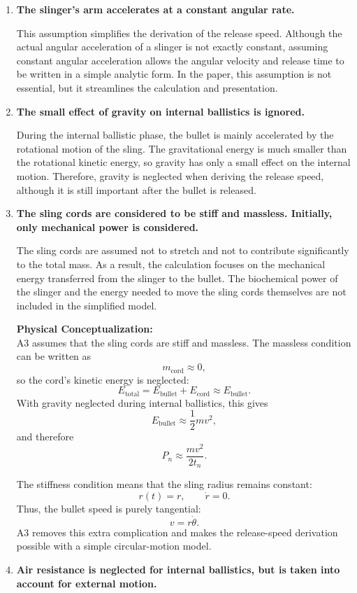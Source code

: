 \documentclass[11pt,letterpaper]{article}
\begin{document}
\begin{enumerate}[label=A\arabic*.]
    \item \textbf{The slinger's arm accelerates at a constant angular rate.}
    
    This assumption simplifies the derivation of the release speed. 
    Although the actual angular acceleration of a slinger is not exactly constant, 
    assuming constant angular acceleration allows the angular velocity and 
    release time to be written in a simple analytic form. In the paper, this 
    assumption is not essential, but it streamlines the calculation and presentation.
\newpage    
    \item \textbf{The small effect of gravity on internal ballistics is ignored.}
    
    During the internal ballistic phase, the bullet is mainly accelerated by the 
    rotational motion of the sling. The gravitational energy is much smaller than 
    the rotational kinetic energy, so gravity has only a small effect on the 
    internal motion. Therefore, gravity is neglected when deriving the release 
    speed, although it is still important after the bullet is released.
    
    \item \textbf{The sling cords are considered to be stiff and massless. Initially, only mechanical power is considered.}
        
    The sling cords are assumed not to stretch and not to contribute significantly 
    to the total mass. As a result, the calculation focuses on the mechanical 
    energy transferred from the slinger to the bullet. The biochemical power of 
    the slinger and the energy needed to move the sling cords themselves are not 
    included in the simplified model.

\begin{physicsinsight}
\textbf{Physical Conceptualization:} 
\\
A3 assumes that the sling cords are stiff and massless. The massless condition can be written as
\[
    m_{\mathrm{cord}} \approx 0,
\]
so the cord's kinetic energy is neglected:
\[
    E_{\mathrm{total}}
    = E_{\mathrm{bullet}} + E_{\mathrm{cord}}
    \approx E_{\mathrm{bullet}}.
\]
With gravity neglected during internal ballistics, this gives
\[
    E_{\mathrm{bullet}} \approx \frac{1}{2}mv^2,
\]
and therefore
\[
    P_n \approx \frac{mv^2}{2t_n}.
\]

The stiffness condition means that the sling radius remains constant:
\[
    r(t)=r, \qquad \dot{r}=0.
\]
Thus, the bullet speed is purely tangential:
\[
    v = r\dot{\theta}.
\]
A3 removes this extra complication and makes the release-speed
derivation possible with a simple circular-motion model.
\end{physicsinsight}
\newpage    
    \item \textbf{Air resistance is neglected for internal ballistics, but is taken into account for external motion.}
    

\end{enumerate}
\end{document}
